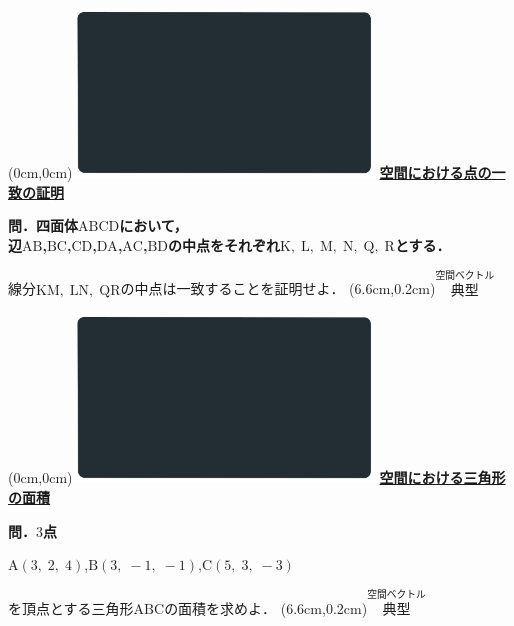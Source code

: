 \documentclass[10pt,
fleqn,
dvipdfmx,
uplatex
]{jsarticle}
\begin{document}
\newpage



\at(0cm,0cm){\includegraphics[width=8cm,bb=0 0 1920 1080]{./media_local/smart_background/空間ベクトル.jpeg}}
{\color{orange}\bf\boldmath\Large\underline{空間における点の一致の証明}}\vspace{0.3zw}

\large 
\bf\boldmath 問．四面体$\text{ABCD}$において，\\
辺$\text{AB}$,\;$\text{BC}$,\;$\text{CD}$,\;$\text{DA}$,\;$\text{AC}$,\;$\text{BD}$の中点をそれぞれ$\text{K},\;\text{L},\;\text{M},\;\text{N},\;\text{Q},\;\text{R}$とする．

\Large
線分$\text{KM},\;\text{LN},\;\text{QR}$の中点は一致することを証明せよ．
\at(6.6cm,0.2cm){\small\color{bradorange}$\overset{\text{空間ベクトル}}{\text{典型}}$}


\newpage



\at(0cm,0cm){\includegraphics[width=8cm,bb=0 0 1920 1080]{./media_local/smart_background/空間ベクトル.jpeg}}
{\color{orange}\bf\boldmath\Large\underline{空間における三角形の面積}}\vspace{0.3zw}

\Large 
\bf\boldmath 問．$3$点

\normalsize
\vspace{0.3zw}
\hspace{0.5zw}$\text{A}\left(3,\;2,\;4\right)$,\;$\text{B}\left(3,\;-1,\;-1\right)$,\;$\text{C}\left(5,\;3,\;-3\right)$
\vspace{0.3zw}

\Large 
を頂点とする三角形$\text{ABC}$の面積を求めよ．
\at(6.6cm,0.2cm){\small\color{bradorange}$\overset{\text{空間ベクトル}}{\text{典型}}$}
\end{document}
